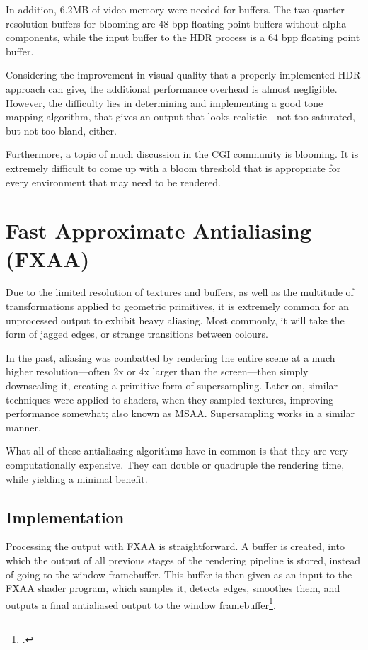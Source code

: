 \documentclass[11pt, oneside]{report}
\begin{document}
In addition, 6.2MB of video memory were needed for buffers. The two quarter resolution buffers for blooming are 48 \gls{bpp} floating point buffers without alpha components, while the input buffer to the HDR process is a 64 \gls{bpp} floating point buffer.

Considering the improvement in visual quality that a properly implemented \gls{HDR} approach can give, the additional performance overhead is almost negligible. However, the difficulty lies in determining and implementing a good \gls{tone mapping} algorithm, that gives an output that looks realistic---not too saturated, but not too bland, either.

Furthermore, a topic of much discussion in the CGI community is blooming. It is extremely difficult to come up with a bloom threshold that is appropriate for every environment that may need to be rendered.

\chapter{Fast Approximate Antialiasing (FXAA)}
Due to the limited resolution of textures and buffers, as well as the multitude of transformations applied to geometric primitives, it is extremely common for an unprocessed output to exhibit heavy \gls{aliasing}. Most commonly, it will take the form of jagged edges, or strange transitions between colours.

In the past, aliasing was combatted by rendering the entire scene at a much higher resolution---often 2x or 4x larger than the screen---then simply downscaling it, creating a primitive form of supersampling. Later on, similar techniques were applied to \glspl{shader}, when they sampled textures, improving performance somewhat; also known as MSAA. Supersampling works in a similar manner.

What all of these antialiasing algorithms have in common is that they are very computationally expensive. They can double or quadruple the rendering time, while yielding a minimal benefit.

\section{Implementation}
Processing the output with \gls{FXAA} is straightforward. A buffer is created, into which the output of all previous stages of the rendering pipeline is stored, instead of going to the window framebuffer. This buffer is then given as an input to the \gls{FXAA} \gls{shader} program, which samples it, detects edges, smoothes them, and outputs a final antialiased output to the window framebuffer\footcite{nvidia-fxaa}.
\end{document}
